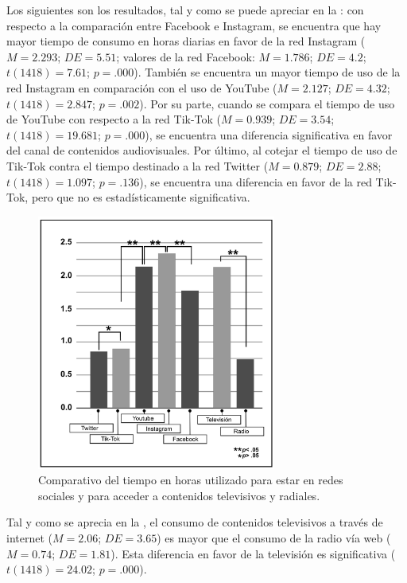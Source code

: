 \documentclass[spanish]{textolivre}
\begin{document}
Los siguientes son los resultados, tal y como se puede apreciar en la : con respecto a la comparación entre Facebook e Instagram, se encuentra que hay mayor tiempo de consumo en horas diarias en favor de la red Instagram ($M = 2.293$; $DE = 5.51$; valores de la red Facebook: $M = 1.786$; $DE = 4.2$; $t(1418) =  7.61$; $p = .000$). También se encuentra un mayor tiempo de uso de la red Instagram en comparación con el uso de YouTube ($M = 2.127$; $DE = 4.32$; $t(1418) = 2.847$; $p = .002$). Por su parte, cuando se compara el tiempo de uso de YouTube con respecto a la red Tik-Tok ($M = 0.939$; $DE = 3.54$; $t(1418) = 19.681$; $p = .000$), se encuentra una diferencia significativa en favor del canal de contenidos audiovisuales. Por último, al cotejar el tiempo de uso de Tik-Tok contra el tiempo destinado a la red Twitter ($M = 0.879$; $DE = 2.88$; $t(1418) = 1.097$; $p = .136$), se encuentra una diferencia en favor de la red Tik-Tok, pero que no es estadísticamente significativa.

\begin{figure}[htbp]
 \centering
 \includegraphics[width=0.7\textwidth]{fig3.jpg}
 \caption{Comparativo del tiempo en horas utilizado para estar en redes sociales y para acceder a contenidos televisivos y radiales.}
 \label{fig3}
\end{figure}

Tal y como se aprecia en la , el consumo de contenidos televisivos a través de internet ($M = 2.06$; $DE = 3.65$) es mayor que el consumo de la radio vía web ($M = 0.74$; $DE = 1.81$). Esta diferencia en favor de la televisión es significativa ($t(1418) = 24.02$; $p = .000$).
\end{document}
